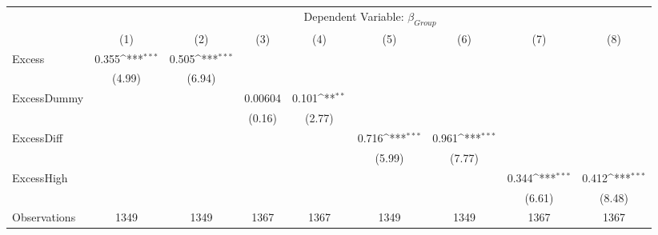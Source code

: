 {
\def\sym#1{\ifmmode^{#1}\else\(^{#1}\)\fi}
\begin{tabular}{l*{8}{c}}
\hline\hline
                &\multicolumn{8}{c}{Dependent Variable: $ \beta_{Group} $ }                                                                                             \\\cmidrule(lr){2-9}
                &\multicolumn{1}{c}{(1)}         &\multicolumn{1}{c}{(2)}         &\multicolumn{1}{c}{(3)}         &\multicolumn{1}{c}{(4)}         &\multicolumn{1}{c}{(5)}         &\multicolumn{1}{c}{(6)}         &\multicolumn{1}{c}{(7)}         &\multicolumn{1}{c}{(8)}         \\
\hline
Excess          &    0.355\sym{***}&    0.505\sym{***}&                  &                  &                  &                  &                  &                  \\
                &   (4.99)         &   (6.94)         &                  &                  &                  &                  &                  &                  \\
[1em]
ExcessDummy     &                  &                  &  0.00604         &    0.101\sym{**} &                  &                  &                  &                  \\
                &                  &                  &   (0.16)         &   (2.77)         &                  &                  &                  &                  \\
[1em]
ExcessDiff      &                  &                  &                  &                  &    0.716\sym{***}&    0.961\sym{***}&                  &                  \\
                &                  &                  &                  &                  &   (5.99)         &   (7.77)         &                  &                  \\
[1em]
ExcessHigh      &                  &                  &                  &                  &                  &                  &    0.344\sym{***}&    0.412\sym{***}\\
                &                  &                  &                  &                  &                  &                  &   (6.61)         &   (8.48)         \\
\hline
Observations    &     1349         &     1349         &     1367         &     1367         &     1349         &     1349         &     1367         &     1367         \\

\end{tabular}}
